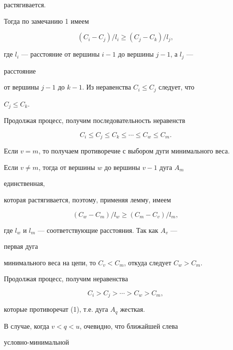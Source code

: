 \begin{pf}
растягивается.


Тогда по замечанию 1 имеем


$$


(C_i-C_j)/l_i\ge (C_j-C_k)/l_j,


$$


где $l_i$ --- расстояние от вершины $i-1$ до вершины $j-1$, а $l_j$ ---


расстояние


от вершины $j-1$ до $k-1$. Из неравенства $C_i\le C_j$ следует, что


$C_j\le C_k$.


Продолжая процесс, получим последовательность неравенств


\begin{equation}


C_i\le C_j\le C_k\le\dotsb \le C_w\le C_m.


\end{equation}





Если $v=m$, то получаем противоречие с выбором дуги минимального веса.





Если $v\ne m$, тогда от вершины $w$ до вершины $v-1$ дуга $A_m$


единственная,


которая растягивается, поэтому, применяя лемму, имеем


$$


(C_w-C_m)/l_w\ge (C_m-C_v)/l_m,


$$


где $l_w$ и $l_m$ --- соответствующие расстояния. Так как $A_v$ ---


первая дуга


минимального веса на цепи, то $C_v<C_m$, откуда следует $C_w>C_m$.


Продолжая процесс, получим неравенства


\begin{equation}


C_i>C_j>\dotsb >C_w>C_m,


\end{equation}


которые противоречат (1), т.е. дуга $A_q$ жесткая.





В случае, когда $v<q<u$, очевидно, что ближайшей слева


условно-минимальной



\end{pf}
